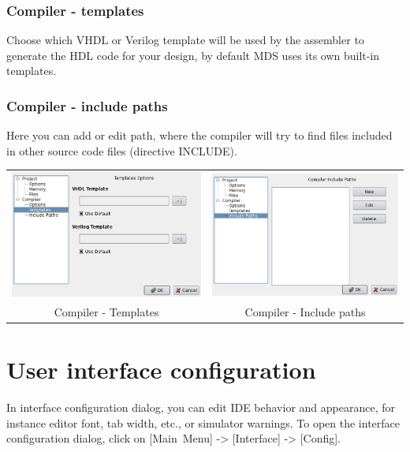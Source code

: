         \subsubsection{Compiler - templates}
            Choose which VHDL or Verilog template will be used by the assembler to generate the HDL code for your
            design, by default MDS uses its own built-in templates.

        \subsubsection{Compiler - include paths}
            Here you can add or edit path, where the compiler will try to find files included in other source code files
            (directive INCLUDE).

            \begin{table}[h!]
                \begin{tabular}{cc}
                    \includegraphics[width=.5\textwidth]{img/config5.png}
                        &
                    \includegraphics[width=.5\textwidth]{img/config6.png}
                        \\
                    Compiler - Templates & Compiler - Include paths
                \end{tabular}
                \end{table}

\section{User interface configuration}
    In interface configuration dialog, you can edit IDE behavior and appearance, for instance editor font, tab width,
    etc., or simulator warnings. To open the interface configuration dialog, click on [Main~Menu] -> [Interface] ->
    [Config].

